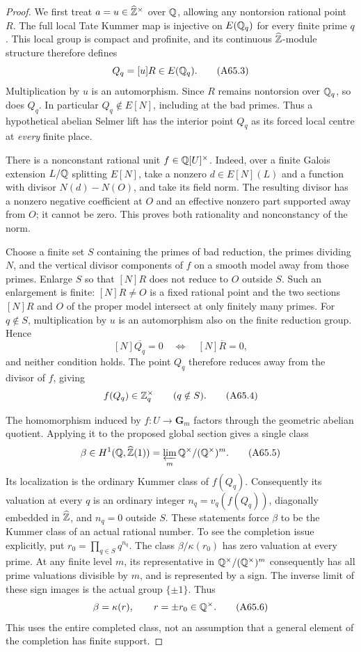 \begin{proof}
We first treat $a=u\in\widehat{\mathbb Z}^\times$ over $\mathbb Q$, allowing any
nontorsion rational point $R$. The full local Tate Kummer map
is injective on $E(\mathbb Q_q)$ for every finite prime $q$. This
local group is compact and profinite, and its continuous
$\widehat{\mathbb Z}$-module structure therefore defines
\[
 Q_q=[u]R\in E(\mathbb Q_q).
 \tag{A65.3}
\]
Multiplication by $u$ is an automorphism. Since $R$ remains
nontorsion over $\mathbb Q_q$, so does $Q_q$. In particular
$Q_q\notin E[N]$, including at the bad primes. Thus a
hypothetical abelian Selmer lift has the interior point $Q_q$
as its forced local centre at \emph{every} finite place.

There is a nonconstant rational unit
$f\in\mathbb Q[U]^\times$. Indeed, over a finite Galois extension
$L/\mathbb Q$ splitting $E[N]$, take a nonzero $d\in E[N](L)$ and
a function with divisor $N(d)-N(O)$, and take its field norm.
The resulting divisor has a nonzero negative coefficient at
$O$ and an effective nonzero part supported away from $O$;
it cannot be zero. This proves both rationality and
nonconstancy of the norm.

Choose a finite set $S$ containing the primes of bad reduction,
the primes dividing $N$, and the vertical divisor components
of $f$ on a smooth model away from those primes. Enlarge $S$
so that $[N]R$ does not reduce to $O$ outside $S$. Such an
enlargement is finite: $[N]R\ne O$ is a fixed rational point
and the two sections $[N]R$ and $O$ of the proper model
intersect at only finitely many primes. For $q\notin S$,
multiplication by $u$ is an automorphism also on the finite
reduction group. Hence
\[
 [N]\overline{Q_q}=0
       \quad\Longleftrightarrow\quad [N]\overline R=0,
\]
and neither condition holds. The point $Q_q$ therefore
reduces away from the divisor of $f$, giving
\[
 f(Q_q)\in\mathbb Z_q^\times\qquad(q\notin S).
 \tag{A65.4}
\]

The homomorphism induced by $f:U\to\mathbf G_m$ factors
through the geometric abelian quotient. Applying it to
the proposed global section gives a single class
\[
 \beta\in H^1(\mathbb Q,\widehat{\mathbb Z}(1))
       =\varprojlim_m\mathbb Q^\times/(\mathbb Q^\times)^m.
 \tag{A65.5}
\]
Its localization is the ordinary Kummer class of $f(Q_q)$.
Consequently its valuation at every $q$ is an ordinary
integer $n_q=v_q(f(Q_q))$, diagonally embedded in
$\widehat{\mathbb Z}$, and $n_q=0$ outside $S$.
These statements force $\beta$ to be the Kummer class of
an actual rational number. To see the completion issue
explicitly, put $r_0=\prod_{q\in S}q^{n_q}$. The class
$\beta/\kappa(r_0)$ has zero valuation at every prime.
At any finite level $m$, its representative in
$\mathbb Q^\times/(\mathbb Q^\times)^m$ consequently has all prime
valuations divisible by $m$, and is represented by a
sign. The inverse limit of these sign images is the
actual group $\{\pm1\}$. Thus
\[
 \beta=\kappa(r),\qquad r=\pm r_0\in\mathbb Q^\times.
 \tag{A65.6}
\]
This uses the entire completed class, not an assumption
that a general element of the completion has finite
support.


\end{proof}
